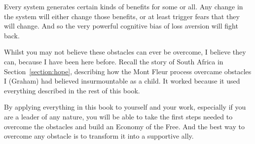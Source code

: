 Every system generates certain kinds of benefits for some or all. Any change in the system will either change those benefits, or at least trigger fears that they will change. And so the very powerful cognitive bias of loss aversion will fight back. 


Whilst you may not believe these obstacles can ever be overcome, I believe they can, because I have been here before. Recall the story of South Africa in Section~\ref{section:hope}, describing how the Mont Fleur process overcame obstacles I (Graham) had believed insurmountable as a child. It worked because it used everything described in the rest of this book.


By applying everything in this book to yourself and your work, especially if you are a leader of any nature, you will be able to take the first steps needed to overcome the obstacles and build an Economy of the Free. And the best way to overcome any obstacle is to transform it into a supportive ally.


